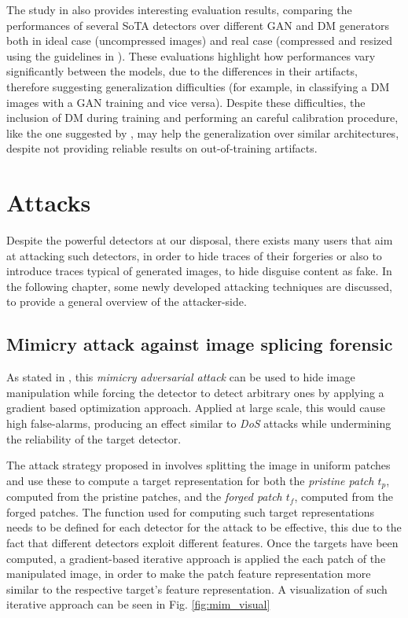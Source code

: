 \documentclass[conference]{IEEEtran} %
\begin{document}
        The study in \cite{corvi2023detection} also provides interesting evaluation results, comparing the performances of several SoTA detectors over different GAN and DM generators both in ideal case (uncompressed images) and real case (compressed and resized using the guidelines in \cite{vipcuplink}). These evaluations highlight how performances vary significantly between the models, due to the differences in their artifacts, therefore suggesting generalization difficulties (for example, in classifying a DM images with a GAN training and vice versa). Despite these difficulties, the inclusion of DM during training and performing an careful calibration procedure, like the one suggested by \cite{Platt1999probabilistic}, may help the generalization over similar architectures, despite not providing reliable results on out-of-training artifacts.

\section{Attacks}
    Despite the powerful detectors at our disposal, there exists many users that aim at attacking such detectors, in order to hide traces of their forgeries or also to introduce traces typical of generated images, to hide disguise content as fake. In the following chapter, some newly developed attacking techniques are discussed, to provide a general overview of the attacker-side.

    \subsection{Mimicry attack against image splicing forensic}
        As stated in \cite{boato2024adversarial}, this \textit{mimicry adversarial attack} can be used to hide image manipulation while forcing the detector to detect arbitrary ones by applying a gradient based optimization approach. Applied at large scale, this would cause high false-alarms, producing an effect similar to \textit{DoS} attacks while undermining the reliability of the target detector.

        The attack strategy proposed in \cite{boato2024adversarial} involves splitting the image in uniform patches and use these to compute a target representation for both the \textit{pristine patch $t_p$}, computed from the pristine patches, and the \textit{forged patch $t_f$}, computed from the forged patches. The function used for computing such target representations needs to be defined for each detector for the attack to be effective, this due to the fact that different detectors exploit different features. Once the targets have been computed, a gradient-based iterative approach is applied the each patch of the manipulated image, in order to make the patch feature representation more similar to the respective target's feature representation. A visualization of such iterative approach can be seen in Fig. \ref{fig:mim_visual}
\end{document}
